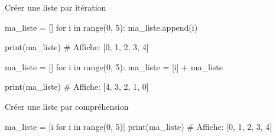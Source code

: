 \pagebreak

\begin{easybox}{Créer une liste par itération}{}

\begin{minipage}{0.48\linewidth}
		\begin{CodePythontexAlt}[Largeur=1\linewidth,Centre,PremLigne=1]{}
ma_liste = []
for i in range(0, 5):
	ma_liste.append(i)

print(ma_liste)		
# Affiche: [0, 1, 2, 3, 4]
		\end{CodePythontexAlt}
	\end{minipage}\hfill
	\begin{minipage}{0.48\linewidth}
		\begin{CodePythontexAlt}[Largeur=1\linewidth,Centre,PremLigne=1]{}
ma_liste = []
for i in range(0, 5):
	ma_liste = [i] + ma_liste

print(ma_liste)
# Affiche: [4, 3, 2, 1, 0]
		
		\end{CodePythontexAlt}
	\end{minipage}
\end{easybox}

\begin{easybox}{Créer une liste par compréhension}{}

	\begin{CodePythontexAlt}[Largeur=1\linewidth,Centre,PremLigne=1]{}
ma_liste = [i for i in range(0, 5)]
print(ma_liste)
# Affiche: [0, 1, 2, 3, 4]
		\end{CodePythontexAlt}
		\end{easybox}

